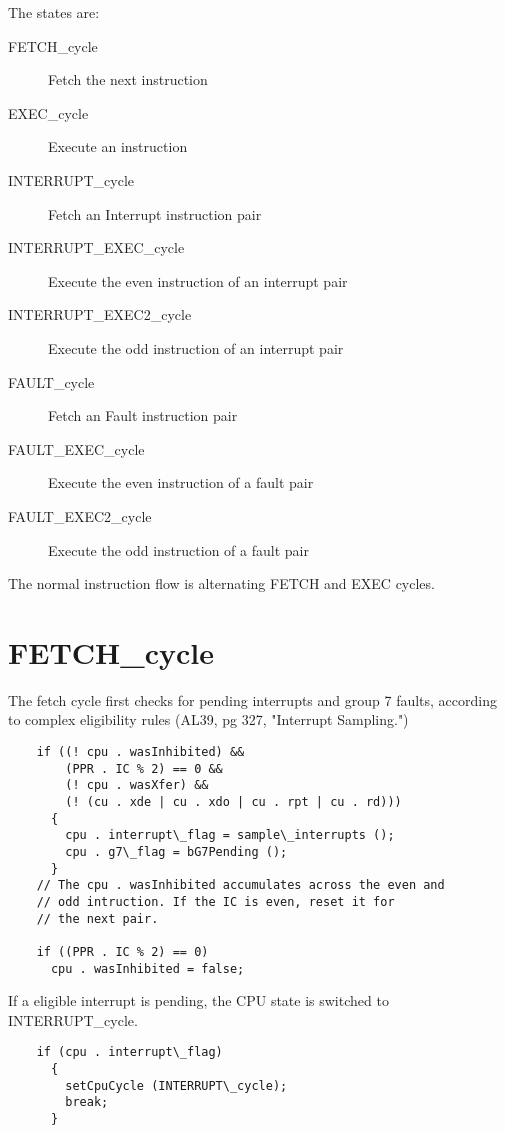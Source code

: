 \documentclass[notitlepage]{report}
\begin{document}
The states are:

\begin{description}
\item [FETCH\_cycle] Fetch the next instruction
\item [EXEC\_cycle] Execute an instruction
\item [INTERRUPT\_cycle] Fetch an Interrupt instruction pair
\item [INTERRUPT\_EXEC\_cycle] Execute the even instruction of an interrupt pair
\item [INTERRUPT\_EXEC2\_cycle] Execute the odd instruction of an interrupt pair
\item [FAULT\_cycle]Fetch an Fault instruction pair
\item [FAULT\_EXEC\_cycle] Execute the even instruction of a fault pair
\item [FAULT\_EXEC2\_cycle] Execute the odd instruction of a fault pair
\end{description}

The normal instruction flow is alternating FETCH and EXEC cycles.

\section{FETCH\_cycle}

The fetch cycle first checks for pending interrupts and group 7 faults, 
according to complex eligibility rules (AL39, pg 327, "Interrupt Sampling.")

\begin{verbatim}
    if ((! cpu . wasInhibited) &&
        (PPR . IC % 2) == 0 &&
        (! cpu . wasXfer) &&
        (! (cu . xde | cu . xdo | cu . rpt | cu . rd)))
      {
        cpu . interrupt\_flag = sample\_interrupts ();
        cpu . g7\_flag = bG7Pending ();
      }
    // The cpu . wasInhibited accumulates across the even and 
    // odd intruction. If the IC is even, reset it for
    // the next pair.

    if ((PPR . IC % 2) == 0)
      cpu . wasInhibited = false;
\end{verbatim}

If a eligible interrupt is pending, the CPU state is switched to 
INTERRUPT\_cycle.

\begin{verbatim}
    if (cpu . interrupt\_flag)
      {
        setCpuCycle (INTERRUPT\_cycle);
        break;
      }
\end{verbatim} 
\end{document}
